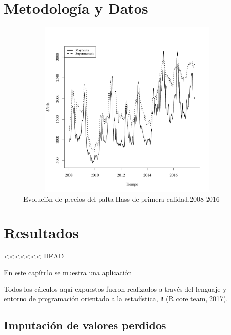 \documentclass[12pt, twoside]{book}\usepackage[]{graphicx}\usepackage[]{color}
\newenvironment{knitrout}{}{} %
\numberwithin{equation}{section}
\numberwithin{theorem}{section}
\numberwithin{teorema}{section}
\numberwithin{defi}{section}
\numberwithin{prop}{section}
\numberwithin{defi}{section}
\theoremstyle{plain}
\begin{document}
\chapter{Metodología y Datos}






\begin{knitrout}
\color{fgcolor}\begin{figure}[H]

{\centering \includegraphics[width=6.5in,height=3.5in]{figure/fig-1-1} 

}

\caption[Evolución de precios del palta Hass de primera calidad,2008-2016]{Evolución de precios del palta Hass de primera calidad,2008-2016}\label{fig:fig-1}
\end{figure}


\end{knitrout}




\chapter{Resultados}
<<<<<<< HEAD

En este capítulo se muestra una aplicación

Todos los cálculos aquí expuestos fueron realizados a través del lenguaje y entorno de programación orientado a la estadística, \texttt{R} (R core team, 2017).

\section{Imputación de valores perdidos}
\end{document}
